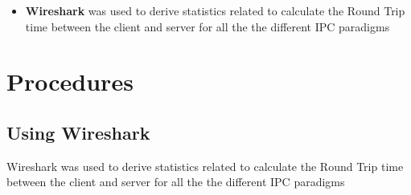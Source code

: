 \documentclass{article}
\begin{document}
\begin{itemize}
\item {\bf Wireshark} was used to derive statistics related to calculate the Round Trip time between the client and server for all the the different IPC paradigms
\end{itemize}



\section{Procedures}

\subsection{Using Wireshark}
Wireshark was used to derive statistics related to calculate the Round Trip time between the client and server for all the the different IPC paradigms \\
\end{document}
